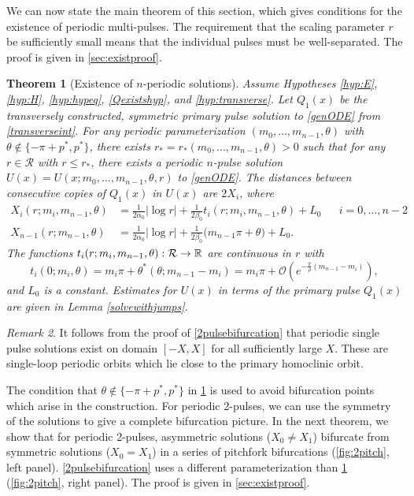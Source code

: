 \documentclass[10pt,reqno]{amsart}
\theoremstyle{plain}
\newtheorem{theorem}{Theorem}
\theoremstyle{definition}
\theoremstyle{remark}
\newtheorem{remark}[theorem]{Remark}
\numberwithin{theorem}{section}
\numberwithin{equation}{section}
\begin{document}
We can now state the main theorem of this section, which gives conditions for the existence of periodic multi-pulses. The requirement that the scaling parameter $r$ be sufficiently small means that the individual pulses must be well-separated. The proof is given in \cref{sec:existproof}. 

\begin{theorem}[Existence of $n$-periodic solutions]\label{th:perexist}
Assume Hypotheses \ref{hyp:E}, \ref{hyp:H}, \ref{hyp:hypeq}, \ref{Qexistshyp}, and \ref{hyp:transverse}. Let $Q_1(x)$ be the transversely constructed, symmetric primary pulse solution to \eqref{genODE} from \cref{transverseint}. For any periodic parameterization $(m_0, \dots, m_{n-1}, \theta)$ with $\theta \notin \{-\pi + p^*, p^* \}$, there exists $r_* = r_*(m_0, \dots, m_{n-1}, \theta) > 0$ such that for any $r \in \mathcal{R}$ with $r \leq r_*$, there exists a periodic $n$-pulse solution $U(x) = U(x; m_0, \dots, m_{n-1}, \theta, r)$ to \eqref{genODE}. The distances between consecutive copies of $Q_1(x)$ in $U(x)$ are $2X_i$, where
\begin{equation}\label{Xi}
\begin{aligned}
	X_i(r; m_i, m_{n-1},\theta) &= \frac{1}{2 \alpha_0} |\log r| + \frac{1}{2\beta_0} t_i(r; m_i,m_{n-1}, \theta) + L_0 && i = 0, \dots, n-2 \\
	X_{n-1}(r; m_{n-1}, \theta) &= \frac{1}{2 \alpha_0} |\log r| + \frac{1}{2 \beta_0}\big( m_{n-1}\pi + \theta \big) + L_0.
\end{aligned}
\end{equation}
The functions $t_i(r; m_i, m_{n-1}, \theta): \mathcal{R} \rightarrow \mathbb{R}$ are continuous in $r$ with 
\[
t_i(0; m_i, \theta) = m_i \pi + \theta^*(\theta; m_{n-1} - m_i) = m_i \pi + \mathcal{O}\left( e^{-\frac{\pi}{\rho}(m_{n-1} - m_i)} \right),
\]
and $L_0$ is a constant. Estimates for $U(x)$ in terms of the primary pulse $Q_1(x)$ are given in Lemma \ref{solvewithjumps}.
\end{theorem}

\begin{remark}
It follows from the proof of \cref{2pulsebifurcation} that periodic single pulse solutions exist on domain $[-X, X]$ for all sufficiently large $X$. These are single-loop periodic orbits which lie close to the primary homoclinic orbit.
\end{remark}

The condition that $\theta \notin \{-\pi + p^*, p^* \}$ in \cref{th:perexist} is used to avoid bifurcation points which arise in the construction. For periodic 2-pulses, we can use the symmetry of the solutions to give a complete bifurcation picture. In the next theorem, we show that for periodic 2-pulses, asymmetric solutions ($X_0 \neq X_1$) bifurcate from symmetric solutions ($X_0 = X_1$) in a series of pitchfork bifurcations (\cref{fig:2pitch}, left panel). \cref{2pulsebifurcation} uses a different parameterization than \cref{th:perexist} (\cref{fig:2pitch}, right panel). The proof is given in \cref{sec:existproof}. 
\end{document}
